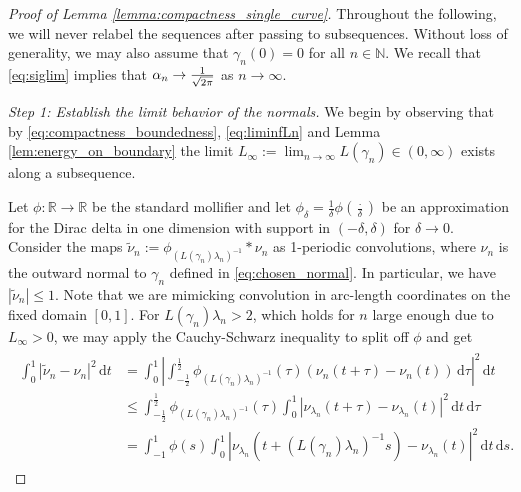 \documentclass[11pt]{article}
\numberwithin{statement}{section}
\numberwithin{equation}{section}
\theoremstyle{remark}
\newcommand{\R}{\mathbb R} 				%
\newcommand{\intd}{\, \mathrm{d}} 				%
\begin{document}
\begin{proof}[Proof of Lemma \ref{lemma:compactness_single_curve}]
  Throughout the following, we will never relabel the sequences after
  passing to subsequences. Without loss of generality, we may also
  assume that $\gamma_n(0) = 0$ for all $n \in \mathbb N$. We
    recall that \eqref{eq:siglim} implies that
    $\alpha_n \to {1 \over \sqrt{2 \pi}}$ as $n \to \infty$.
  
  \textit{Step 1: Establish the limit behavior of the normals.}
  We begin by observing that by
    \eqref{eq:compactness_boundedness}, \eqref{eq:liminfLn} and Lemma
    \ref{lem:energy_on_boundary} the limit
  $L_\infty:= \lim_{n \to \infty} L(\gamma_{n}) \in (0,\infty)$ exists
  along a subsequence.
  
  Let $\phi : \R \to \R$ be the standard mollifier and let
  $\phi_\delta = \frac{1}{\delta} \phi \left( \frac{\cdot}{\delta}
  \right)$ be an approximation for the Dirac delta in one dimension
  with support in $(-\delta, \delta)$ for $\delta \to 0$.  Consider
  the maps
  $\tilde \nu_{n} := \phi_{(L(\gamma_{n}) {\lambda_n})^{-1}} \ast
  \nu_{n}$ as 1-periodic convolutions, where $\nu_n$ is the outward
  normal to $\gamma_n$ defined in \eqref{eq:chosen_normal}. In
  particular, we have $|\tilde \nu_n| \leq 1$. Note that we are
  mimicking convolution in arc-length coordinates on the fixed domain
  $[0,1]$.  For $L(\gamma_{{n}}) \lambda_{n} > 2$, which holds for $n$
  large enough due to $L_\infty>0$, we may apply the Cauchy-Schwarz
  inequality to split off $\phi$ and get
          \begin{align}\label{eq:rigidity_close}
	  \begin{split}
            \int_0^1 |\tilde \nu_{n} - \nu_{n}|^2 \intd t & = \int_0^1
            \left|\int_{-\frac{1}{2}}^{\frac{1}{2}}
              \phi_{(L(\gamma_{n}){\lambda_n})^{-1}} (\tau) (\nu_{n}(t
              + \tau) - \nu_{n}(t)) \intd \tau \right|^2 \intd t
            \\
            & \leq \int_{-\frac{1}{2}}^{\frac{1}{2}}
            \phi_{(L(\gamma_{n}) {\lambda_n})^{-1}} (\tau) \int_0^1
            \left|\nu_{\lambda_n}(t + \tau) -
              \nu_{\lambda_n}(t) \right|^2 \intd t \intd \tau \\
            & = \int_{-1}^{1} \phi (s) \int_0^1
              \left|\nu_{\lambda_n}(t + (L(\gamma_n) \lambda_n)^{-1}
                s) - \nu_{\lambda_n}(t) \right|^2 \intd t \intd s .
	  \end{split}
	\end{align}

\end{proof}
\end{document}

